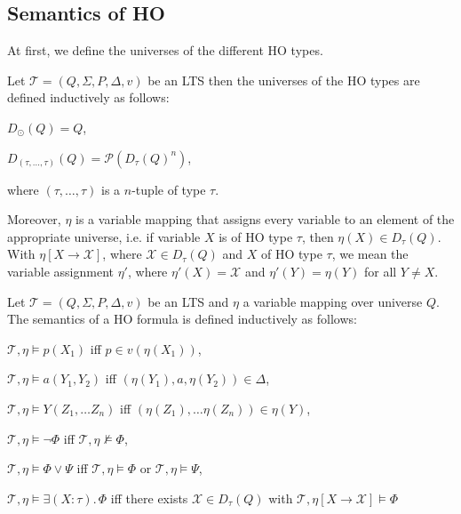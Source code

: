 \subsection{Semantics of HO}\label{subsec:hoSemantics}

At first, we define the universes of the different HO types.

\begin{definition}
    Let $\mathcal{T} = (Q, \Sigma, P, \Delta, v)$ be an LTS then the universes of the HO types are defined inductively as follows:
    \begin{compactitem}
        \item $D_\odot(Q) = Q$,
        \item $D_{(\tau, \dots, \tau)}(Q) = \mathcal{P}(D_{\tau}(Q)^n)$,
    \end{compactitem}
    where $(\tau, \dots, \tau)$ is a $n$-tuple of type $\tau$.
\end{definition}

Moreover, $\eta$ is a variable mapping that assigns every variable to an element of the appropriate universe, i.e. if
variable $X$ is of HO type $\tau$, then $\eta(X) \in D_{\tau}(Q)$. With $\eta[X \rightarrow \mathcal{X}]$,
where $\mathcal{X} \in D_\tau(Q)$ and $X$ of HO type $\tau$, we mean the variable assignment $\eta'$,
where $\eta'(X) = \mathcal{X}$ and $\eta'(Y) = \eta(Y)$ for all $Y \neq X$.

\begin{definition}
    Let $\mathcal{T} = (Q, \Sigma, P, \Delta, v)$ be an LTS and $\eta$ a variable mapping over universe $Q$. The
    semantics of a HO formula is defined inductively as follows:
    \begin{compactitem}
        \item $\mathcal{T}, \eta \models p(X_1)$ iff $p \in v(\eta(X_1))$,
        \item $\mathcal{T}, \eta \models a(Y_1, Y_2)$ iff $(\eta(Y_1), a, \eta(Y_2)) \in \Delta$,
        \item $\mathcal{T}, \eta \models Y(Z_1, \dots Z_n)$ iff $(\eta(Z_1), \dots
        \eta(Z_n)) \in \eta(Y)$,
        \item $\mathcal{T}, \eta \models \neg\Phi$ iff $\mathcal{T}, \eta\not\models\Phi$,
        \item $\mathcal{T}, \eta \models \Phi \vee \Psi$ iff $\mathcal{T}, \eta\models\Phi$ or $\mathcal{T},
        \eta\models\Psi$,
        \item $\mathcal{T}, \eta \models \exists (X\colon\tau).\,\Phi$ iff there exists $\mathcal{X} \in D_{\tau}
        (Q)$ with $\mathcal{T}, \eta[X \rightarrow \mathcal{X}] \models \Phi$
        \end{compactitem}
\end{definition}

